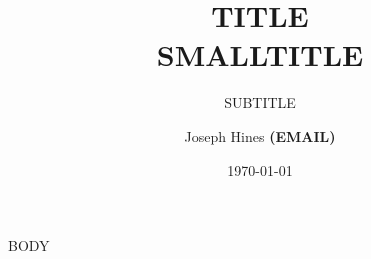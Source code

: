 \documentclass[12pt]{article}
\title{\textbf{ TITLE
    \\{\Large SMALLTITLE}}}
\subtitle{SUBTITLE}
\author{Joseph Hines \textbf{(EMAIL)}}
\date{\today}
\begin{document}
\begin{titlingpage}
\maketitle
\end{titlingpage}

BODY
\end{document}
